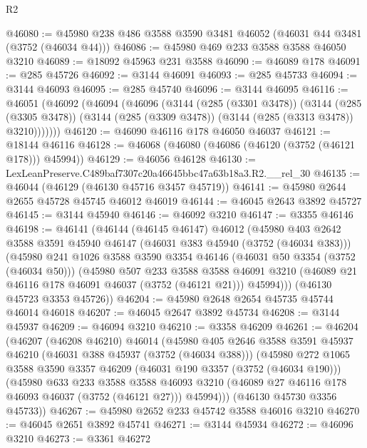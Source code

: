 \begin{lexlean}{R2}
\begin{coremodule}
@46080 := @45980 @238 @486 @3588 @3590 @3481 @46052 (@46031 @44 @3481 (@3752 (@46034 @44)))
@46086 := @45980 @469 @233 @3588 @3588 @46050 @3210
@46089 := @18092 @45963 @231 @3588
@46090 := @46089 @178
@46091 := @285 @45726
@46092 := @3144 @46091
@46093 := @285 @45733
@46094 := @3144 @46093
@46095 := @285 @45740
@46096 := @3144 @46095
@46116 := @46051
    (@46092
      (@46094
        (@46096
          (@3144
            (@285 (@3301 @3478))
            (@3144
              (@285 (@3305 @3478))
              (@3144 (@285 (@3309 @3478)) (@3144 (@285 (@3313 @3478)) @3210)))))))
@46120 := @46090 @46116 @178 @46050 @46037
@46121 := @18144 @46116
@46128 := @46068 (@46080 (@46086 (@46120 (@3752 (@46121 @178))) @45994))
@46129 := @46056 @46128
@46130 := LexLeanPreserve.C489baf7307c20a46645bbc47a63b18a3.R2.__rel_30
@46135 := @46044 (@46129 (@46130 @45716 @3457 @45719))
@46141 := @45980 @2644 @2655 @45728 @45745 @46012 @46019
@46144 := @46045 @2643 @3892 @45727
@46145 := @3144 @45940
@46146 := @46092 @3210
@46147 := @3355 @46146
@46198 := @46141
    (@46144
      (@46145 @46147)
      @46012
      (@45980
        @403
        @2642
        @3588
        @3591
        @45940
        @46147
        (@46031 @383 @45940 (@3752 (@46034 @383)))
        (@45980
          @241
          @1026
          @3588
          @3590
          @3354
          @46146
          (@46031 @50 @3354 (@3752 (@46034 @50)))
          (@45980
            @507
            @233
            @3588
            @3588
            @46091
            @3210
            (@46089 @21 @46116 @178 @46091 @46037 (@3752 (@46121 @21)))
            @45994)))
      (@46130 @45723 @3353 @45726))
@46204 := @45980 @2648 @2654 @45735 @45744 @46014 @46018
@46207 := @46045 @2647 @3892 @45734
@46208 := @3144 @45937
@46209 := @46094 @3210
@46210 := @3358 @46209
@46261 := @46204
    (@46207
      (@46208 @46210)
      @46014
      (@45980
        @405
        @2646
        @3588
        @3591
        @45937
        @46210
        (@46031 @388 @45937 (@3752 (@46034 @388)))
        (@45980
          @272
          @1065
          @3588
          @3590
          @3357
          @46209
          (@46031 @190 @3357 (@3752 (@46034 @190)))
          (@45980
            @633
            @233
            @3588
            @3588
            @46093
            @3210
            (@46089 @27 @46116 @178 @46093 @46037 (@3752 (@46121 @27)))
            @45994)))
      (@46130 @45730 @3356 @45733))
@46267 := @45980 @2652 @233 @45742 @3588 @46016 @3210
@46270 := @46045 @2651 @3892 @45741
@46271 := @3144 @45934
@46272 := @46096 @3210
@46273 := @3361 @46272

\end{coremodule}
\end{lexlean}

